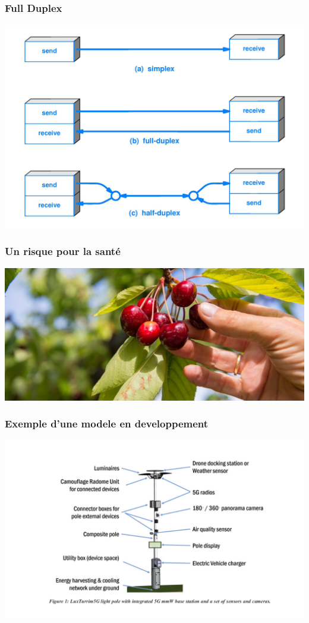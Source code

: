 \documentclass{beamer}
\begin{document}
    \begin{frame}
        \frametitle{Full Duplex}
        \includegraphics[width=\linewidth]{img/full-duplex.jpg}
    \end{frame}

    \begin{frame}
        \frametitle{Un risque pour la santé}
        \includegraphics[width=\linewidth]{img/cherry.jpg}
    \end{frame}

    \begin{frame}
        \frametitle{Exemple d'une modele en developpement}
        \includegraphics[width=\linewidth]{img/Antenne.png}
    \end{frame}
\end{document}
